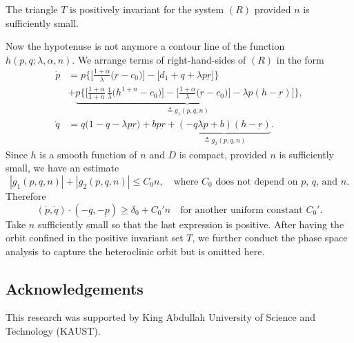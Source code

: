 \documentclass[graybox]{svmult}
\def\dpp{\dot{p}}
\def\dqq{\dot{q}}
\begin{document}
\begin{lemma}
The triangle $T$  is positively invariant for the system $(R)$ provided $n$ is sufficiently small.
\end{lemma}
Now the hypotenuse is not anymore a contour line of the function $h(p,q;\lambda,\alpha,n)$. We arrange terms of right-hand-sides of $(R)$ in the form
\begin{align*}
 {\dpp}&=p\bigg\{\Big[\frac{1+\alpha}{\lambda }\Big(\underbar{r}-c_0\Big)\Big] -\Big[d_1 + q + \lambda p\underbar{r}\Big]\bigg\} \\
 &+ \underbrace{p\bigg\{\Big[\frac{1+\alpha}{1+n}\,\frac{1}{\lambda }\Big(h^{1+n}-c_0\Big)\Big]-\Big[\frac{1+\alpha}{\lambda }\Big(\underbar{r}-c_0\Big)\Big] -\lambda p(h-\underbar{r})\Big]\bigg\}}_\text{$\triangleq g_1(p,q,n)$},\\
 {\dqq}&=q\Big(1-q-\lambda p \underbar{r}\Big) + bp\underbar{r} + \underbrace{(-q\lambda p+b) (h-\underbar{r})}_\text{$\triangleq g_2(p,q,n)$}.
\end{align*}
Since $h$ is a smooth function of $n$ and $D$ is compact, provided $n$ is sufficiently small, we have an estimate
\begin{equation*}
 |g_1(p,q,n)| + |g_2(p,q,n)| \le C_0 n, \quad \text{where $C_0$ does not depend on $p$, $q$, and $n$.}
\end{equation*}
Therefore
$$ (\dot{p},\dot{q}) \cdot(-\underbar{q},-\underbar{p}) \ge \delta_0 + C_0'n \quad \text{for another uniform constant $C_0'$}.$$
Take $n$ sufficiently small so that the last expression is positive. After having the orbit confined in the positive invariant set $T$, we further conduct the phase space analysis to capture the heteroclinic orbit but is omitted here.
\subsection*{Acknowledgements}
This research was supported by King Abdullah University of Science and Technology (KAUST).
\end{document}
